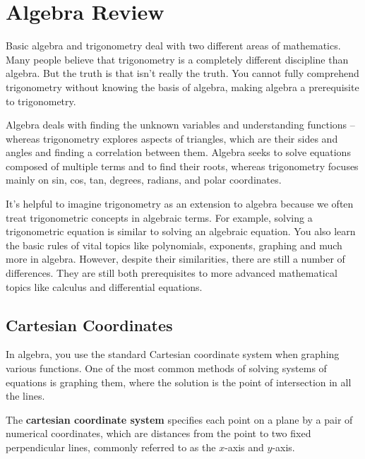 \chapter{Algebra Review}
\label{chap:algebra_tools_needed_to_study_trigonometry}

Basic algebra and trigonometry deal with two different areas of mathematics.
Many people believe that trigonometry is a completely different discipline than
algebra. But the truth is that isn't really the truth. You cannot fully
comprehend trigonometry without knowing the basis of algebra, making algebra a
prerequisite to trigonometry.

Algebra deals with finding the unknown variables and understanding functions --
whereas trigonometry explores aspects of triangles, which are their sides and
angles and finding a correlation between them. Algebra seeks to solve equations
composed of multiple terms and to find their roots, whereas trigonometry
focuses mainly on sin, cos, tan, degrees, radians, and polar coordinates.

It's helpful to imagine trigonometry as an extension to algebra because we
often treat trigonometric concepts in algebraic terms. For example, solving a
trigonometric equation is similar to solving an algebraic equation. You also
learn the basic rules of vital topics like polynomials, exponents, graphing and
much more in algebra. However, despite their similarities, there are still a
number of differences. They are still both prerequisites to more advanced
mathematical topics like calculus and differential equations.

\section{Cartesian Coordinates}
\label{sec:cartesian_coordinates}

In algebra, you use the standard Cartesian coordinate system when graphing
various functions. One of the most common methods of solving systems of
equations is graphing them, where the solution is the point of intersection in
all the lines.

\begin{definition}
  \label{def:cartesian_coordinate_system}

  The \textbf{cartesian coordinate system} specifies each point on a plane by a
  pair of numerical coordinates, which are distances from the point to two
  fixed perpendicular lines, commonly referred to as the $x$-axis and $y$-axis.
\end{definition}

